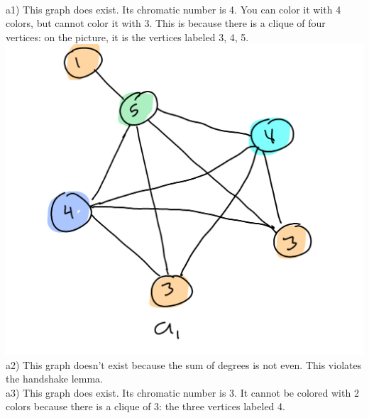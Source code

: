 \documentclass{article}
\begin{document}
\begin{solution} \\
	a1)  This graph does exist. Its chromatic number is 4. You can color it with 4 colors, but cannot color it with 3. This is because there is a clique of four vertices: on the picture, it is the vertices labeled 3, 4, 5.
	\\ \includegraphics[scale=0.2]{a1.png}
	\\
	a2) This graph doesn't exist because the sum of degrees is not even. This violates the handshake lemma.
	\\
	a3) This graph does exist. Its chromatic number is 3. It cannot be colored with 2 colors because there is a clique of 3: the three vertices labeled 4.

\end{solution}
\end{document}
